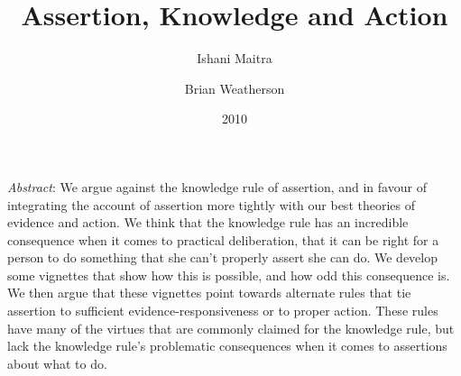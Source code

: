 \documentclass[
  11pt,
  letterpaper,
  DIV=11,
  numbers=noendperiod,
  twoside]{scrartcl}
\title{Assertion, Knowledge and Action}
\author{Ishani Maitra \and Brian Weatherson}
\date{2010}
\renewenvironment{abstract}
 {\vspace{-1.25cm}
 \quotation\small\noindent\emph{Abstract}:}
 {\endquotation}
\begin{document}
\maketitle
\begin{abstract}
We argue against the knowledge rule of assertion, and in favour of
integrating the account of assertion more tightly with our best theories
of evidence and action. We think that the knowledge rule has an
incredible consequence when it comes to practical deliberation, that it
can be right for a person to do something that she can't properly assert
she can do. We develop some vignettes that show how this is possible,
and how odd this consequence is. We then argue that these vignettes
point towards alternate rules that tie assertion to sufficient
evidence-responsiveness or to proper action. These rules have many of
the virtues that are commonly claimed for the knowledge rule, but lack
the knowledge rule's problematic consequences when it comes to
assertions about what to do.
\end{abstract}
\end{document}
